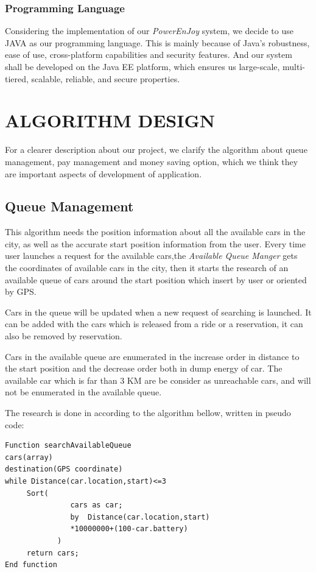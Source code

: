 \documentclass[a4paper,11pt]{article}
\begin{document}
	\subsubsection{Programming Language}
	Considering the implementation of our \textsl{PowerEnJoy} system, we decide to use JAVA as our programming language. This is mainly because of Java's robustness, ease of use, cross-platform capabilities and security features. And our system shall be developed on the Java EE platform, which ensures us large-scale, multi-tiered, scalable, reliable, and secure properties.

\newpage
\section{ALGORITHM DESIGN}
For a clearer description about our project, we clarify the algorithm about queue management, pay management and money saving option, which we think they are important aspects of development of application.
	\subsection{Queue Management}
	This algorithm needs the position information about all the available cars in the city, as well as the accurate start position information from the user. Every time user launches a request for the available cars,the \textsl{Available Queue Manger} gets the coordinates of available cars in the city, then it starts the research of an available queue of cars around the start position which insert by user or oriented by GPS.

Cars in the queue will be updated when a new request of searching is launched. It can be added with the cars which is released from a ride or a reservation, it can also be removed by reservation.

Cars in the available queue are enumerated in the increase order in distance to the start position and the decrease order both in dump energy of car. The available car which is far than 3 KM are be consider as unreachable cars, and will not be enumerated in the available queue.

The research is done in according to the algorithm bellow, written in pseudo code:


\begin{lstlisting}[language={[ANSI]C}, frame=shadowbox]
Function searchAvailableQueue
cars(array)
destination(GPS coordinate)
while Distance(car.location,start)<=3
     Sort(
               cars as car;
               by  Distance(car.location,start)
               *10000000+(100-car.battery)
            )
     return cars;
End function

\end{lstlisting}
\end{document}

